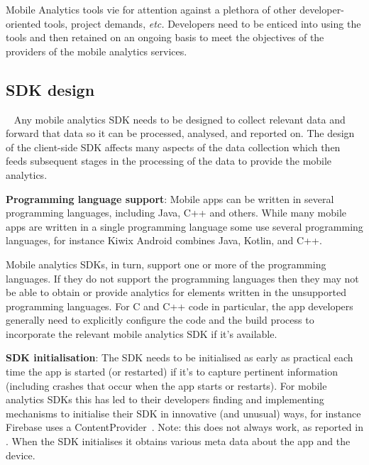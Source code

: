 Mobile Analytics tools vie for attention against a plethora of other developer-oriented tools, project demands, \emph{etc.} Developers need to be enticed into using the tools and then retained on an ongoing basis to meet the objectives of the providers of the mobile analytics services.

\subsection{SDK design}~\label{section-sdk-design}
Any mobile analytics SDK needs to be designed to collect relevant data and forward that data so it can be processed, analysed, and reported on. The design of the client-side SDK affects many aspects of the data collection which then feeds subsequent stages in the processing of the data to provide the mobile analytics.

\textbf{Programming language support}: 
Mobile apps can be written in several programming languages, including Java, C++ and others. While many mobile apps are written in a single programming language some use several programming languages, for instance Kiwix Android combines Java, Kotlin, and C++. 

Mobile analytics SDKs, in turn, support one or more of the programming languages. If they do not support the programming languages then they may not be able to obtain or provide analytics for elements written in the unsupported programming languages. For C and C++ code in particular, the app developers generally need to explicitly configure the code and the build process to incorporate the relevant mobile analytics SDK if it's available. %

\textbf{SDK initialisation}: 
The SDK needs to be initialised as early as practical each time the app is started (or restarted) if it's to capture pertinent information (including crashes that occur when the app starts or restarts). For mobile analytics SDKs this has led to their developers finding and implementing mechanisms to initialise their SDK in innovative (and unusual) ways, for instance Firebase uses a ContentProvider~\citep{stevenson2016_how_does_firebase_initialize_on_android}. Note: this does not always work, as reported in \citep{reddy2022_crashlytics_fails_to_track_app_startup_crashes}. When the SDK initialises it obtains various meta data about the app and the device. 

